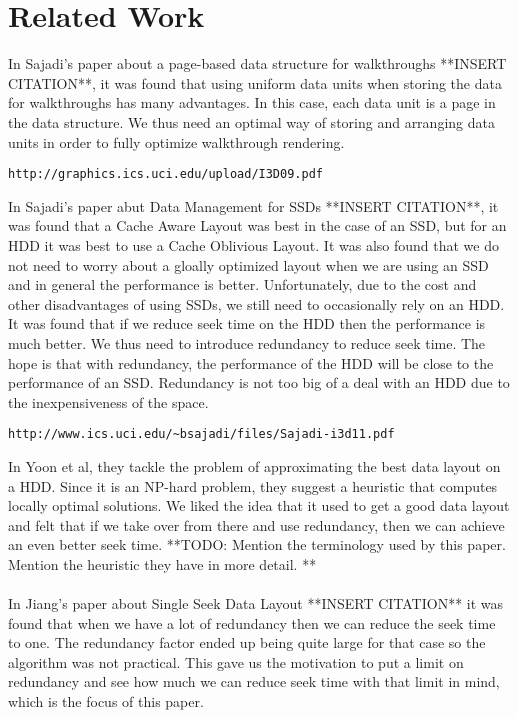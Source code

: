 \documentclass[11pt,psfig]{article}
\begin{document}
\section*{Related Work}

In Sajadi's paper about a page-based data structure for walkthroughs **INSERT CITATION**, it was found that using uniform data units when storing the data for walkthroughs has many advantages. In this case, each data unit is a page in the data structure. We thus need an optimal way of storing and arranging data units in order to fully optimize walkthrough rendering. 
\begin{verbatim}
http://graphics.ics.uci.edu/upload/I3D09.pdf
\end{verbatim}
In Sajadi's paper abut Data Management for SSDs **INSERT CITATION**, it was found that a Cache Aware Layout was best in the case of an SSD, but for an HDD it was best to use a Cache Oblivious Layout. It was also found that we do not need to worry about a gloally optimized layout when we are using an SSD and in general the performance is better. Unfortunately, due to the cost and other disadvantages of using SSDs, we still need to occasionally rely on an HDD. It was found that if we reduce seek time on the HDD then the performance is much better. We thus need to introduce redundancy to reduce seek time. The hope is that with redundancy, the performance of the HDD will be close to the performance of an SSD. Redundancy is not too big of a deal with an HDD due to the inexpensiveness of the space. \\
\begin{verbatim}
http://www.ics.uci.edu/~bsajadi/files/Sajadi-i3d11.pdf
\end{verbatim}
In Yoon et al, they tackle the problem of approximating the best data layout on a HDD. Since it is an NP-hard problem, they suggest a heuristic that computes locally optimal solutions. We liked the idea that it used to get a good data layout and felt that if we take over from there and use redundancy, then we can achieve an even better seek time.
**TODO: Mention the terminology used by this paper. Mention the heuristic they have in more detail. **\\
\\
In Jiang's paper about Single Seek Data Layout **INSERT CITATION** it was found that when we have a lot of redundancy then we can reduce the seek time to one. The redundancy factor ended up being quite large for that case so the algorithm was not practical. This gave us the motivation to put a limit on redundancy and see how much we can reduce seek time with that limit in mind, which is the focus of this paper. 
\end{document}
